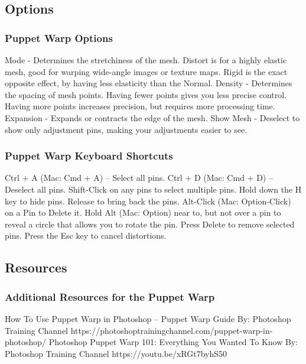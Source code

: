 \documentclass{beamer}
\begin{document}
\subsection{Options}		
\begin{frame}
	\frametitle{Puppet Warp Options}
	\begin{outline}
		\1 Mode - 
		\2 Determines the stretchiness of the mesh.
		\2 Distort is for a highly elastic mesh, good for warping wide-angle images or texture maps.
		\2 Rigid is the exact opposite effect, by having less elasticity than the Normal.
		\1 Density - 
		\2 Determines the spacing of mesh points. Having fewer points gives you less precise control. 
		\2 Having more points increases precision, but requires more processing time.
		\1 Expansion - 
		\2 Expands or contracts the edge of the mesh.
		\1 Show Mesh - 
		\2 Deselect to show only adjustment pins, making your adjustments easier to see.
	\end{outline}
\end{frame}

\begin{frame}
	\frametitle{Puppet Warp Keyboard Shortcuts}
	\begin{outline}
		\1 Ctrl + A (Mac: Cmd + A) – Select all pins.
		\1 Ctrl + D (Mac: Cmd + D) – Deselect all pins.
		\1 Shift-Click on any pins to select multiple pins.
		\1 Hold down the H key to hide pins. Release to bring back the pins.
		\1 Alt-Click (Mac: Option-Click) on a Pin to Delete it.
		\1 Hold Alt (Mac: Option) near to, but not over a pin to reveal a circle that allows you to rotate the pin.
		\1 Press Delete to remove selected pins.
		\1 Press the Esc key to cancel distortions.
	\end{outline}
\end{frame}

\subsection{Resources}		
\begin{frame}
	\frametitle{Additional Resources for the Puppet Warp}
	\begin{outline}
		\1 How To Use Puppet Warp in Photoshop – Puppet Warp Guide
		\2  By:  Photoshop Training Channel
		\2 https://photoshoptrainingchannel.com/puppet-warp-in-photoshop/
		\1 Photoshop Puppet Warp 101: Everything You Wanted To Know
		\2  By:  Photoshop Training Channel
		\2 https://youtu.be/xRGt7byhS50
	\end{outline}
\end{frame}
	
\end{document}

